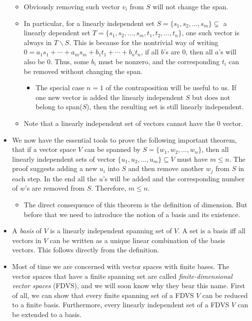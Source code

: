 \documentclass{article}
\begin{document}
\begin{itemize}
    \begin{itemize}
        \item Obviously removing such vector $v_i$ from $S$ will not change the span.
        \item In particular, for a linearly independent set $S = \{s_1, s_2, \dots , s_m\} \subsetneq$ a linearly dependent set $T = \{s_1, s_2, \dots , s_m, t_1, t_2, \dots , t_n\}$, one such vector is always in $T \backslash S$. This is because for the nontrivial way of writing $0 = a_1s_1 + \cdots +a_ms_m + b_1 t_1 + \cdots + b_n t_n$, if all $b$'s are 0, then all $a$'s will also be 0. Thus, some $b_i$ must be nonzero, and the corresponding $t_i$ can be removed without changing the span.
        \begin{itemize}
            \item The special case $n=1$ of the contraposition will be useful to us. If one new vector is added the linearly independent $S$ but does not belong to span($S$), then the resulting set is still linearly independent.
        \end{itemize}
        \item Note that a linearly independent set of vectors cannot have the $0$ vector.
    \end{itemize}
    \item We now have the essential tools to prove the following important theorem, that if a vector space $V$ can be spanned by $S = \{w_1, w_2, \dots,w_n\}$, then all linearly independent sets of vector $\{u_1,u_2,\dots,u_m\} \subseteq V$ must have $m \leq n$. The proof suggests adding a new $u_i$ into $S$ and then remove another $w_j$ from $S$ in each step. In the end all the $u$'s will be added and the corresponding number of $w$'s are removed from $S$. Therefore, $m \leq n$.
    \begin{itemize}
        \item The direct consequence of this theorem is the definition of dimension. But before that we need to introduce the notion of a basis and its existence.
    \end{itemize}
    \item A \textit{basis} of $V$ is a linearly independent spanning set of $V$. A set is a basis iff all vectors in $V$ can be written as a unique linear combination of the basis vectors. This follows directly from the definition.
    \item Most of time we are concerned with vector spaces with finite bases. The vector spaces that have a finite spanning set are called \textit{finite-dimensional vector spaces} (FDVS), and we will soon know why they bear this name. First of all, we can show that every finite spanning set of a FDVS $V$ can be reduced to a finite basis. Furthermore, every linearly independent set of a FDVS $V$ can be extended to a basis.

\end{itemize}
\end{document}
